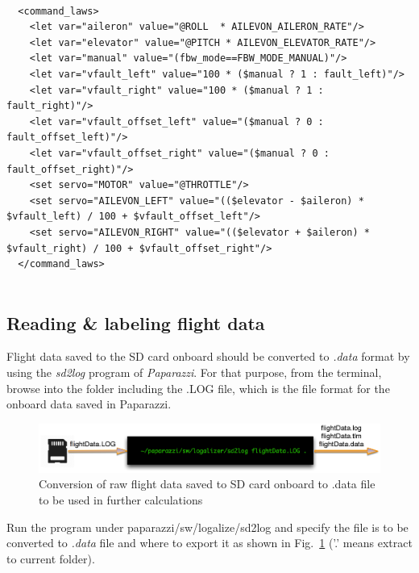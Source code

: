 \lstset{language=C}
\begin{lstlisting}

  <command_laws>
    <let var="aileron" value="@ROLL  * AILEVON_AILERON_RATE"/>
    <let var="elevator" value="@PITCH * AILEVON_ELEVATOR_RATE"/>
    <let var="manual" value="(fbw_mode==FBW_MODE_MANUAL)"/>
    <let var="vfault_left" value="100 * ($manual ? 1 : fault_left)"/>
    <let var="vfault_right" value="100 * ($manual ? 1 : fault_right)"/>
    <let var="vfault_offset_left" value="($manual ? 0 : fault_offset_left)"/>
    <let var="vfault_offset_right" value="($manual ? 0 : fault_offset_right)"/>
    <set servo="MOTOR" value="@THROTTLE"/>
    <set servo="AILEVON_LEFT" value="(($elevator - $aileron) * $vfault_left) / 100 + $vfault_offset_left"/>
    <set servo="AILEVON_RIGHT" value="(($elevator + $aileron) * $vfault_right) / 100 + $vfault_offset_right"/>
  </command_laws>
  
\end{lstlisting}


\subsection{Reading \& labeling flight data}


Flight data saved to the SD card onboard should be converted to \emph{.data} format by using the \textit{sd2log} program of \emph{Paparazzi}. For that purpose, from the terminal, browse into the folder including  the .LOG file, which is the file format for the onboard data saved in Paparazzi. 

\begin{figure}[h]
\begin{center}
\includegraphics[width=15cm]{figures/dataManip}    %
\caption{Conversion of raw flight data saved to SD card onboard to .data file to be used in further calculations} 
\label{fig:dataManip}
\end{center}
\end{figure}

Run the program under paparazzi/sw/logalize/sd2log and specify the file is to be converted to \emph{.data} file and where to export it as shown in Fig.~\ref{fig:dataManip} ('.' means extract to current folder). 

